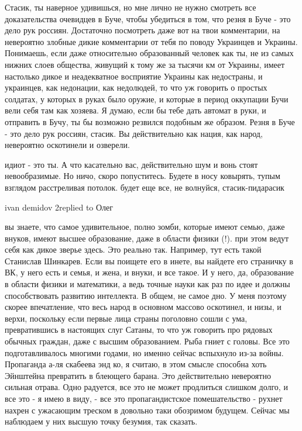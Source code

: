 Стасик, ты наверное удивишься, но мне лично не нужно смотреть все
доказательства очевидцев в Буче, чтобы убедиться в том, что резня в Буче - это
дело рук россиян. Достаточно посмотреть даже вот на твои комментарии, на
невероятно злобные дикие комментарии от тебя по поводу Украинцев и Украины.
Понимаешь, если даже относительно образованный человек как ты, не из самых
нижних слоев общества, живущий к тому же за тысячи км от Украины, имеет
настолько дикое и неадекватное восприятие Украины как недостраны, и украинцев,
как недонации, как недолюдей, то что уж говорить о простых солдатах, у которых
в руках было оружие, и которые в период оккупации Бучи вели себя там как
хозяева. Я думаю, если бы тебе дать автомат в руки, и отправить в Бучу, ты бы
возможно резвился подобным же образом. Резня в Буче - это дело рук россиян,
стасик. Вы действительно как нация, как народ, невероятно оскотинели и
озверели.

идиот - это ты. А что касательно вас, действительно шум и вонь стоят
невообразимые. Но ничо, скоро попуститесь. Будете в носу ковырять, тупым
взглядом расстреливая потолок. будет еще все, не волнуйся, стасик-пидарасик

ivan demidov 2replied to Олег

вы знаете, что самое удивительное, полно зомби, которые имеют семью, даже
внуков, имеют высшее образование, даже в области физики (!). при этом ведут
себя как дикое зверье здесь. Это реально так. Например, тут есть такой
Станислав Шинкарев. Если вы поищете его в инете, вы найдете его страничку в ВК,
у него есть и семья, и жена, и внуки, и все такое. И у него, да, образование в
области физики и математики, а ведь точные науки как раз по идее и должны
способствовать развитию интеллекта. В общем, не самое дно. У меня поэтому
скорее впечатление, что весь народ в основном массово оскотинел, и низы, и
верхи, поскольку если первые лица страны поголовно сошли с ума, превратившись в
настоящих слуг Сатаны, то что уж говорить про рядовых обычных граждан, даже с
высшим образованием. Рыба гниет с головы. Все это подготавливалось многими
годами, но именно сейчас вспыхнуло из-за войны. Пропаганда а-ля скабеева энд
ко, я считаю, в этом смысле способна хоть Эйнштейна превратить в блеющего
барана. Это действительно невероятно сильная отрава. Одно радуется, все это не
может продлиться слишком долго, и все это - я имею в виду, - все это
пропагандистское помешательство - рухнет нахрен с ужасающим треском в довольно
таки обозримом будущем. Сейчас мы наблюдаем у них высшую точку безумия, так
сказать.


